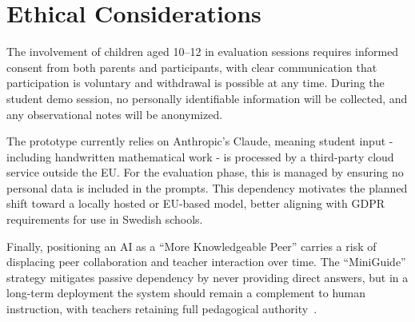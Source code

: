 \section{Ethical Considerations}


The involvement of children aged 10--12 in evaluation sessions requires informed consent from both parents and participants, with clear communication that participation is voluntary and withdrawal is possible at any time. During the student demo session, no personally identifiable information will be collected, and any observational notes will be anonymized.

The prototype currently relies on Anthropic's Claude, meaning student input - including handwritten mathematical work - is processed by a third-party cloud service outside the EU. For the evaluation phase, this is managed by ensuring no personal data is included in the prompts. This dependency motivates the planned shift toward a locally hosted or EU-based model, better aligning with GDPR requirements for use in Swedish schools.
    
Finally, positioning an AI as a \enquote{More Knowledgeable Peer} carries a risk of displacing peer collaboration and teacher interaction over time. The \enquote{MiniGuide} strategy mitigates passive dependency by never providing direct answers, but in a long-term deployment the system should remain a complement to human instruction, with teachers retaining full pedagogical authority~\cite{lindgren2024emerging}.